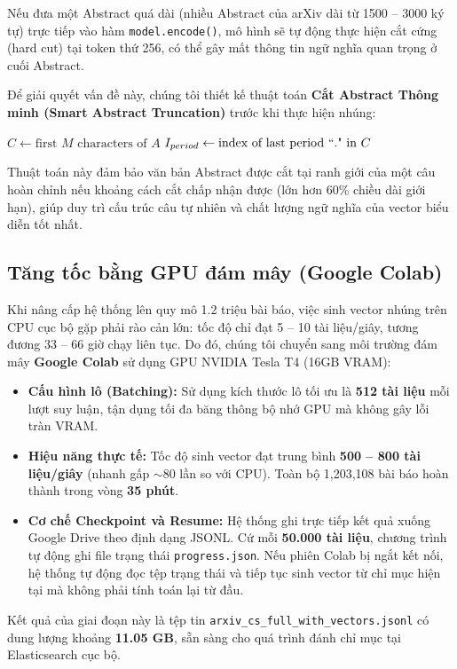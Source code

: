 Nếu đưa một Abstract quá dài (nhiều Abstract của arXiv dài từ 1500 -- 3000 ký tự) trực tiếp vào hàm \texttt{model.encode()}, mô hình sẽ tự động thực hiện cắt cứng (hard cut) tại token thứ 256, có thể gây mất thông tin ngữ nghĩa quan trọng ở cuối Abstract.

\newpage

Để giải quyết vấn đề này, chúng tôi thiết kế thuật toán \textbf{Cắt Abstract Thông minh (Smart Abstract Truncation)} trước khi thực hiện nhúng:\par\medskip

\begin{algorithm}[H]
\DontPrintSemicolon
{}
$C \gets \text{first } M \text{ characters of } A$\;
$I_{period} \gets \text{index of last period } ``. \text{" in } C$\;
\caption{Thuật toán Cắt Abstract Thông minh theo ranh giới câu}
\label{alg:truncation}
\end{algorithm}

Thuật toán này đảm bảo văn bản Abstract được cắt tại ranh giới của một câu hoàn chỉnh nếu khoảng cách cắt chấp nhận được (lớn hơn 60\% chiều dài giới hạn), giúp duy trì cấu trúc câu tự nhiên và chất lượng ngữ nghĩa của vector biểu diễn tốt nhất.

\subsection{Tăng tốc bằng GPU đám mây (Google Colab)}
Khi nâng cấp hệ thống lên quy mô 1.2 triệu bài báo, việc sinh vector nhúng trên CPU cục bộ gặp phải rào cản lớn: tốc độ chỉ đạt 5 -- 10 tài liệu/giây, tương đương 33 -- 66 giờ chạy liên tục. Do đó, chúng tôi chuyển sang môi trường đám mây \textbf{Google Colab} sử dụng GPU NVIDIA Tesla T4 (16GB VRAM):
\begin{itemize}
    \item \textbf{Cấu hình lô (Batching):} Sử dụng kích thước lô tối ưu là \textbf{512 tài liệu} mỗi lượt suy luận, tận dụng tối đa băng thông bộ nhớ GPU mà không gây lỗi tràn VRAM.
    \item \textbf{Hiệu năng thực tế:} Tốc độ sinh vector đạt trung bình \textbf{500 -- 800 tài liệu/giây} (nhanh gấp $\sim$80 lần so với CPU). Toàn bộ 1,203,108 bài báo hoàn thành trong vòng \textbf{35 phút}.
    \item \textbf{Cơ chế Checkpoint và Resume:} Hệ thống ghi trực tiếp kết quả xuống Google Drive theo định dạng JSONL. Cứ mỗi \textbf{50.000 tài liệu}, chương trình tự động ghi file trạng thái \texttt{progress.json}. Nếu phiên Colab bị ngắt kết nối, hệ thống tự động đọc tệp trạng thái và tiếp tục sinh vector từ chỉ mục hiện tại mà không phải tính toán lại từ đầu.
\end{itemize}

Kết quả của giai đoạn này là tệp tin \texttt{arxiv\_cs\_full\_with\_vectors.jsonl} có dung lượng khoảng \textbf{11.05 GB}, sẵn sàng cho quá trình đánh chỉ mục tại Elasticsearch cục bộ.
